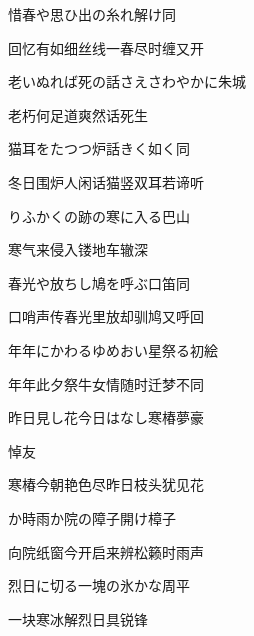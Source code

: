 \begin{haiku}
    {\FH 惜春や思ひ出の糸れ解け}\hfill{\FH 同}

    {\FK 回忆有如细丝线一春尽时缠又开}
\end{haiku}

\begin{haiku}
    {\FH 老いぬれば死の話さえさわやかに}\hfill{\FH 朱城}

    {\FK 老朽何足道爽然话死生}
\end{haiku}

\begin{haiku}
    {\FH 猫耳をたつつ炉話きく如く}\hfill{\FH 同}

    {\FK 冬日围炉人闲话猫竖双耳若谛听}
\end{haiku}

\begin{haiku}
    {\FH {}りふかくの跡の寒に入る}\hfill{\FH 巴山}

    {\FK 寒气来侵入镂地车辙深}
\end{haiku}

\begin{haiku}
    {\FH 春光や放ちし鳩を呼ぶ口笛}\hfill{\FH 同}

    {\FK 口哨声传春光里放却驯鸠又呼回}
\end{haiku}

\begin{haiku}
    {\FH 年年にかわるゆめおい星祭る}\hfill{\FH 初絵}

    {\FK 年年此夕祭牛女情随时迁梦不同}
\end{haiku}

\begin{haiku}
    {\FH 昨日見し花今日はなし寒椿}\hfill{\FH 夢豪}

    {\FK 悼友}

    {\FK 寒椿今朝艳色尽昨日枝头犹见花}
\end{haiku}

\begin{haiku}
    {\FH {}か時雨か院の障子開け}\hfill{\FH 樟子}

    {\FK 向院纸窗今开启来辨松籁时雨声}
\end{haiku}

\begin{haiku}
    {\FH 烈日に切る一塊の氷かな}\hfill{\FH 周平}

    {\FK 一块寒冰解烈日具锐锋}
\end{haiku}


